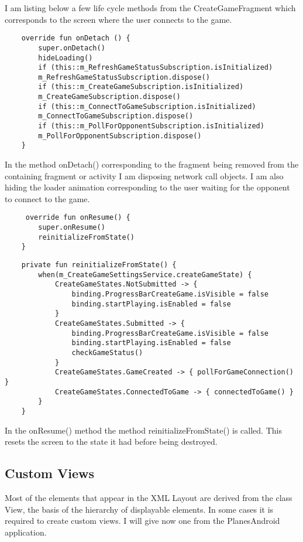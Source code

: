 I am listing below a few life cycle methods from the CreateGameFragment which corresponds to the screen where the user connects to the game.

\begin{lstlisting}
	override fun onDetach () {
		super.onDetach()
		hideLoading()
		if (this::m_RefreshGameStatusSubscription.isInitialized)
		m_RefreshGameStatusSubscription.dispose()
		if (this::m_CreateGameSubscription.isInitialized)
		m_CreateGameSubscription.dispose()
		if (this::m_ConnectToGameSubscription.isInitialized)
		m_ConnectToGameSubscription.dispose()
		if (this::m_PollForOpponentSubscription.isInitialized)
		m_PollForOpponentSubscription.dispose()
	}
\end{lstlisting}

In the method onDetach() corresponding to the fragment being removed from the containing fragment or activity I am disposing network call objects. I am also hiding the loader animation corresponding to the user waiting for the opponent to connect to the game. 

\begin{lstlisting}
	 override fun onResume() {
		super.onResume()
		reinitializeFromState()
	}
\end{lstlisting}

\begin{lstlisting}
	private fun reinitializeFromState() {
		when(m_CreateGameSettingsService.createGameState) {
			CreateGameStates.NotSubmitted -> {
				binding.ProgressBarCreateGame.isVisible = false
				binding.startPlaying.isEnabled = false
			}
			CreateGameStates.Submitted -> {
				binding.ProgressBarCreateGame.isVisible = false
				binding.startPlaying.isEnabled = false
				checkGameStatus()
			}
			CreateGameStates.GameCreated -> { pollForGameConnection() }
			CreateGameStates.ConnectedToGame -> { connectedToGame() }
		}
	}
\end{lstlisting}

In the onResume() method the method reinitializeFromState() is called. This resets the screen to the state it had before being destroyed.

\subsection{Custom Views}

Most of the elements that appear in the XML Layout are derived from the class View, the basis of the hierarchy of displayable elements. In some cases it is required to create custom views. I will give now one from the PlanesAndroid application.

